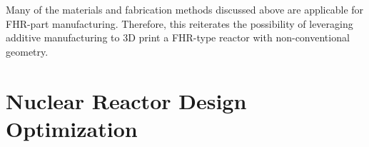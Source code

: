 Many of the materials and fabrication methods discussed above are applicable 
for \gls{FHR}-part manufacturing. 
Therefore, this reiterates the possibility of leveraging additive manufacturing to 3D print a
\gls{FHR}-type reactor with non-conventional geometry. 

\section{Nuclear Reactor Design Optimization}
\label{sec:opt}